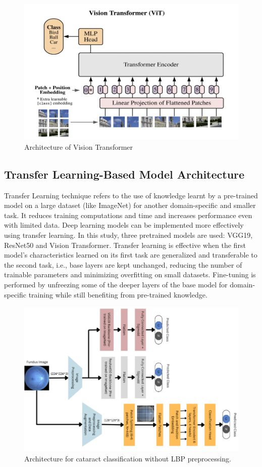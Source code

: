 \documentclass{ijclclp}
\begin{document}
\begin{figure}[ht]
    \centering
    \includegraphics[width=0.6\linewidth]{image7.png}
    \caption{Architecture of Vision Transformer}
    \label{fig:vit-arch}
\end{figure}
\vspace{5cm}

\subsection{Transfer Learning-Based Model Architecture}
\vspace{1em}

Transfer Learning technique refers to the use of knowledge learnt by a pre-trained model on a large dataset (like ImageNet) for another domain-specific and smaller task. It reduces training computations and time and increases performance even with limited data. Deep learning models can be implemented more effectively using transfer learning. In this study, three pretrained models are used: VGG19, ResNet50 and Vision Transformer. Transfer learning is effective when the first model's characteristics learned on its first task are generalized and transferable to the second task, i.e., base layers are kept unchanged, reducing the number of trainable parameters and minimizing overfitting on small datasets. Fine-tuning is performed by unfreezing some of the deeper layers of the base model for domain-specific training while still benefiting from pre-trained knowledge.
\vspace{1em}
\begin{figure}[ht]
    \centering
    \includegraphics[width=0.95\linewidth]{image99.png}
    \caption{Architecture for cataract classification without LBP preprocessing.}
    \label{fig:arch}
\end{figure}
\end{document}
